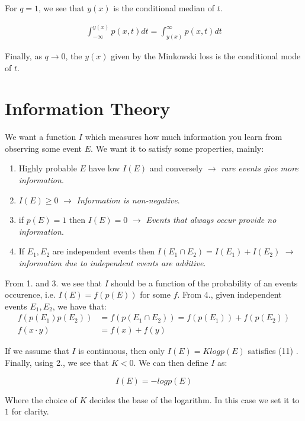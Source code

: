 \documentclass[]{article}
\theoremstyle{mattstyle}
\theoremstyle{definition}
\begin{document}
For $q=1$, we see that $y(x)$ is the conditional median of $t$.

\begin{align}
\int_{-\infty}^{y(x)} p(x,t)dt = \int_{y(x)}^{\infty} p(x,t)dt
\end{align}

Finally, as $q \rightarrow 0$, the $y(x)$ given by the Minkowski loss is the conditional mode of $t$.

\newpage

\section{Information Theory}

We want a function $I$ which measures how much information you learn from observing some event $E$. We want it to satisfy some properties, mainly:

\begin{enumerate}
	\item Highly probable $E$ have low $I(E)$ and conversely $\rightarrow$ \emph{ rare events give more information}.
	\item $I(E) \ge 0$ $\rightarrow$\emph{ Information is non-negative}.
	\item if $p(E)=1$ then $I(E) = 0$ $\rightarrow$\emph{ Events that always occur provide no information}.
	\item If $E_1, E_2$ are independent events then $I(E_1 \cap E_2) = I(E_1) + I(E_2)$ $\rightarrow$\emph{ information due to independent events are additive}.
\end{enumerate}
From 1. and 3. we see that $I$ should be a function of the probability of an events occurence, i.e. $I(E)=f(p(E))$ for some $f$. From 4., given independent events $E_1, E_2$, we have that:
\begin{align}
f(p(E_1)p(E_2)) &= f(p(E_1\cap E_2)) = f(p(E_1)) + f(p(E_2))\\
f(x\cdot y) &= f(x) + f(y)
\end{align}

If we assume that $I$ is continuous, then only $I(E) = Klog p(E)$ satisfies (11)  \cite{EntNotes}. Finally, using 2., we see that $K<0$. We can then define $I$ as:

\begin{equation}
I(E) = -log p(E)
\end{equation}

Where the choice of $K$ decides the base of the logarithm. In this case we set it to $1$ for clarity.
\end{document}

